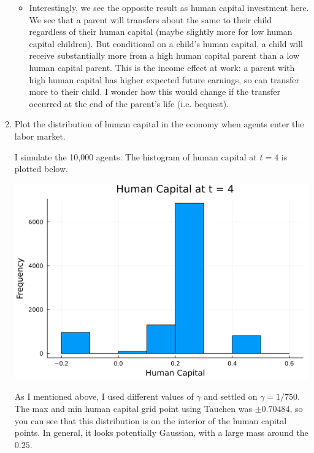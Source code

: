 \documentclass{article}
\begin{document}
\begin{enumerate}
\begin{itemize}
\begin{center}
\end{center}

\item Interestingly, we see the opposite result as human capital investment here.  We see that a parent will transfers about the same to their child regardless of their human capital (maybe slightly more for low human capital children).  But conditional on a child's human capital, a child will receive substantially more from a high human capital parent than a low human capital parent.  This is the income effect at work: a parent with high human capital has higher expected future earnings, so can transfer more to their child.  I wonder how this would change if the transfer occurred at the end of the parent's life (i.e. bequest).

\end{itemize}

\item Plot the distribution of human capital in the economy when agents enter the labor market.

I simulate the 10,000 agents. The histogram of human capital at $t=4$ is plotted below. 

\begin{center}

\includegraphics[scale =0.5]{hc_histogram}

\end{center}

As I mentioned above, I used different values of $\gamma$ and settled on $\gamma = 1/750$.  The max and min human capital grid point using Tauchen was $\pm 0.70484$, so you can see that this distribution is on the interior of the human capital points.  In general, it looks potentially Gaussian, with a large mass around the $0.25$.


\end{enumerate}
\end{document}
